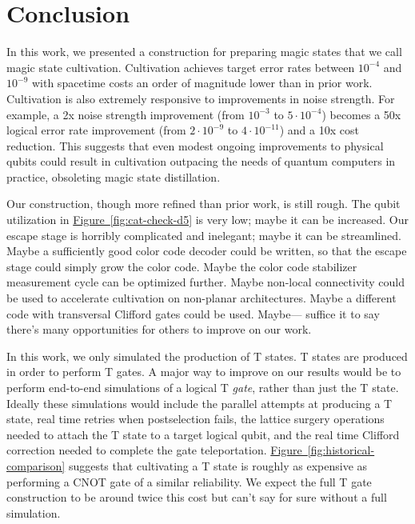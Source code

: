 \documentclass[onecolumn,unpublished,a4paper]{quantumarticle}
\theoremstyle{definition}
\newcommand{\fig}[1]{\hyperref[fig:#1]{Figure~\ref*{fig:#1}}}
\begin{document}
\section{Conclusion}
\label{sec:conclusion}

In this work, we presented a construction for preparing magic states that we call magic state cultivation.
Cultivation achieves target error rates between $10^{-4}$ and $10^{-9}$ with spacetime costs an order of magnitude lower than in prior work.
Cultivation is also extremely responsive to improvements in noise strength.
For example, a 2x noise strength improvement (from $10^{-3}$ to $5 \cdot 10^{-4}$) becomes a 50x logical error rate improvement (from $2 \cdot 10^{-9}$ to $4 \cdot 10^{-11}$) and a 10x cost reduction.
This suggests that even modest ongoing improvements to physical qubits could result in cultivation outpacing the needs of quantum computers in practice, obsoleting magic state distillation.

Our construction, though more refined than prior work, is still rough.
The qubit utilization in \fig{cat-check-d5} is very low; maybe it can be increased.
Our escape stage is horribly complicated and inelegant; maybe it can be streamlined.
Maybe a sufficiently good color code decoder could be written, so that the escape stage could simply grow the color code.
Maybe the color code stabilizer measurement cycle can be optimized further.
Maybe non-local connectivity could be used to accelerate cultivation on non-planar architectures.
Maybe a different code with transversal Clifford gates could be used.
Maybe--- suffice it to say there's many opportunities for others to improve on our work.

In this work, we only simulated the production of T states.
T states are produced in order to perform T gates.
A major way to improve on our results would be to perform end-to-end simulations of a logical T \emph{gate}, rather than just the T state.
Ideally these simulations would include the parallel attempts at producing a T state, real time retries when postselection fails, the lattice surgery operations needed to attach the T state to a target logical qubit, and the real time Clifford correction needed to complete the gate teleportation.
\fig{historical-comparison} suggests that cultivating a T state is roughly as expensive as performing a CNOT gate of a similar reliability.
We expect the full T gate construction to be around twice this cost but can't say for sure without a full simulation.
\end{document}
